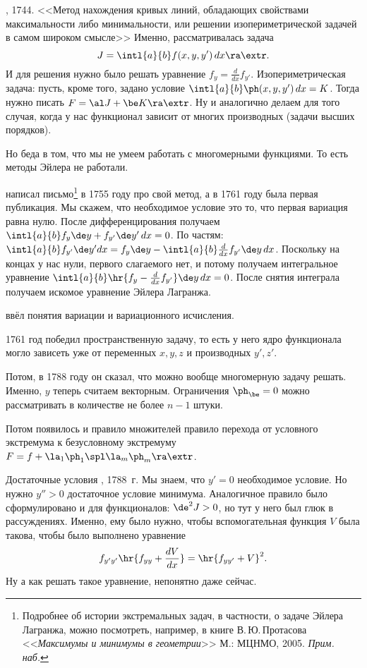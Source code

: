 \documentclass[a4paper,oneside,fleqn,10pt]{article}
\begin{document}
, 1744. <<Метод нахождения кривых линий, обладающих свойствами максимальности
либо минимальности, или решении изопериметрической задачей в самом широком смысле>>
Именно, рассматривалась задача
$$J = \intl{a}{b} f(x, y, y')\dx \ra \extr.$$
И для решения нужно было решать уравнение $f_y = \frac{d}{dx} f_{y'}$.
Изопериметрическая задача: пусть, кроме того, задано условие
$\intl{a}{b} \ph(x,y,y')\dx = K$. Тогда нужно писать $F = \al J + \be K \ra \extr$.
Ну и аналогично делаем для того случая, когда у нас функционал зависит от многих производных
(задачи высших порядков).

Но беда в том, что мы не умеем работать с многомерными функциями.
То есть методы Эйлера не работали.

 написал  письмо\footnote{Подробнее об истории экстремальных задач,
в частности, о задаче Эйлера Лагранжа, можно посмотреть, например,
в книге В.\,Ю.\,Протасова <<\emph{Максимумы и минимумы в геометрии}>> М.: МЦНМО, 2005. \emph{Прим. наб.}}
в 1755 году про свой метод, а в 1761 году была первая
публикация. Мы скажем, что необходимое условие это то, что первая вариация
равна нулю. После дифференцирования получаем
$\intl{a}{b} f_y \de y + f_{y'} \de y'\dx = 0$.
По частям:
$\intl{a}{b} f_{y'} \de y'dx = f_y\de y - \intl{a}{b} \frac{d}{dx} f_{y'}\de y \dx$.
Поскольку на концах у нас нули, первого слагаемого нет, и потому получаем интегральное уравнение
$\intl{a}{b} \hr{f_y - \frac{d}{dx} f_{y'} }\de y \dx = 0$.
После снятия интеграла получаем искомое уравнение Эйлера Лагранжа.

 ввёл понятия вариации и вариационного исчисления.

1761 год  победил пространственную задачу, то есть у него ядро функционала
могло зависеть уже от переменных $x,y,z$ и производных $y', z'$.

Потом, в 1788 году он сказал, что можно вообще многомерную задачу решать.
Именно, $y$ теперь считаем векторным. Ограничения $\ph_\be = 0$ можно рассматривать
в количестве не более $n-1$ штуки.

Потом появилось и правило множителей  правило перехода от условного экстремума
к безусловному экстремуму $F = f + \la_1 \ph_1\spl \la_m \ph_m \ra \extr$.

Достаточные условия , 1788~г. Мы знаем, что $y' = 0$ необходимое условие.
Но нужно $y''> 0$ достаточное условие минимума.
Аналогичное правило было сформулировано и для функционалов: $\de^2 J > 0$, но тут у него был глюк
в рассуждениях. Именно, ему было нужно, чтобы вспомогательная функция $V$ была такова, чтобы
было выполнено уравнение
$$f_{y'y'} \hr{f_{yy} + \frac{dV}{dx}} = \hr{f_{yy'} + V}^2.$$
Ну а как решать такое уравнение, непонятно даже сейчас.
\end{document}
